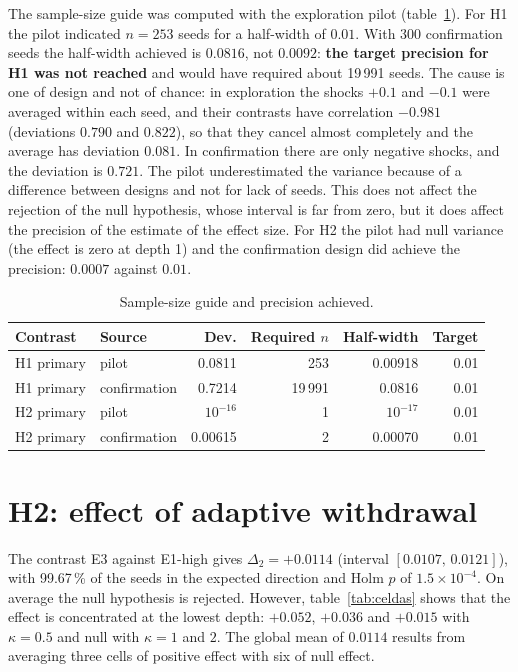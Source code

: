 The sample-size guide was computed with the exploration pilot (table~\ref{tab:muestra}). For H1 the pilot indicated $n=253$ seeds for a half-width of $0.01$. With 300 confirmation seeds the half-width achieved is $0.0816$, not $0.0092$: \textbf{the target precision for H1 was not reached} and would have required about 19\,991 seeds. The cause is one of design and not of chance: in exploration the shocks $+0.1$ and $-0.1$ were averaged within each seed, and their contrasts have correlation $-0.981$ (deviations $0.790$ and $0.822$), so that they cancel almost completely and the average has deviation $0.081$. In confirmation there are only negative shocks, and the deviation is $0.721$. The pilot underestimated the variance because of a difference between designs and not for lack of seeds. This does not affect the rejection of the null hypothesis, whose interval is far from zero, but it does affect the precision of the estimate of the effect size. For H2 the pilot had null variance (the effect is zero at depth 1) and the confirmation design did achieve the precision: $0.0007$ against $0.01$.

\begin{table}[htbp]
\centering
\caption{Sample-size guide and precision achieved.}
\label{tab:muestra}
\small
\begin{tabular}{@{}llrrrr@{}}
\toprule
Contrast & Source & Dev. & Required $n$ & Half-width & Target \\
\midrule
H1 primary & pilot & 0.0811 & 253 & 0.00918 & 0.01 \\
H1 primary & confirmation & 0.7214 & 19\,991 & 0.0816 & 0.01 \\
H2 primary & pilot & $10^{-16}$ & 1 & $10^{-17}$ & 0.01 \\
H2 primary & confirmation & 0.00615 & 2 & 0.00070 & 0.01 \\
\bottomrule
\end{tabular}
\end{table}

\section{H2: effect of adaptive withdrawal}
\label{sec:res-h2}

The contrast E3 against E1-high gives $\Delta_2=+0.0114$ (interval $[0.0107,\,0.0121]$), with 99.67\,\% of the seeds in the expected direction and Holm $p$ of $1.5\times10^{-4}$. On average the null hypothesis is rejected. However, table~\ref{tab:celdas} shows that the effect is concentrated at the lowest depth: $+0.052$, $+0.036$ and $+0.015$ with $\kappa=0.5$ and null with $\kappa=1$ and $2$. The global mean of $0.0114$ results from averaging three cells of positive effect with six of null effect.

